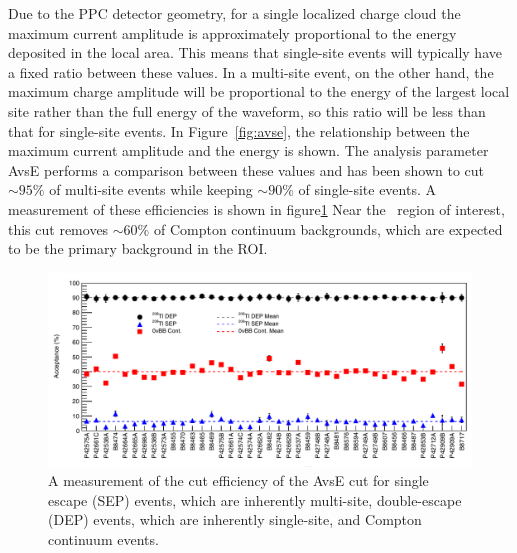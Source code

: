 \documentclass[/main.tex]{subfiles}
\begin{document}
Due to the PPC detector geometry, for a single localized charge cloud the maximum current amplitude is approximately proportional to the energy deposited in the local area.
This means that single-site events will typically have a fixed ratio between these values.
In a multi-site event, on the other hand, the maximum charge amplitude will be proportional to the energy of the largest local site rather than the full energy of the waveform, so this ratio will be less than that for single-site events.
In Figure~\ref{fig:avse}, the relationship between the maximum current amplitude and the energy is shown.
The analysis parameter AvsE performs a comparison between these values and has been shown to cut ${\sim}95\%$ of multi-site events while keeping ${\sim}90\%$ of single-site events.
A measurement of these efficiencies is shown in figure\ref{fig:avseeff}
Near the \znbb\ region of interest, this cut removes ${\sim}60\%$ of Compton continuum backgrounds, which are expected to be the primary background in the ROI.
\begin{figure}
  \centering
  \includegraphics[width=\textwidth]{avseefficiency}
  \caption[Multi-site waveform cut efficiency]{\label{fig:avseeff}
    A measurement of the cut efficiency of the AvsE cut for single escape (SEP) events, which are inherently multi-site, double-escape (DEP) events, which are inherently single-site, and Compton continuum events.
  }
\end{figure}
\end{document}
